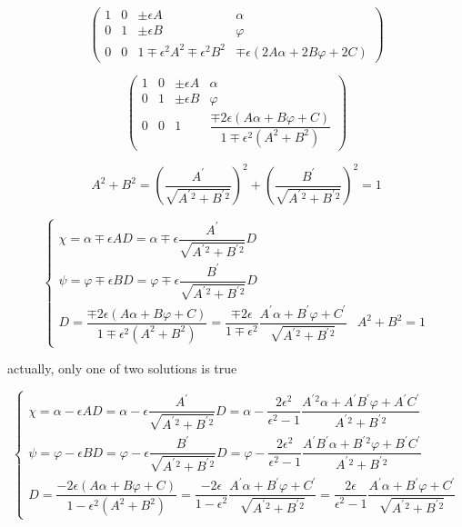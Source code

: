 \documentclass[
]{book}
\theoremstyle{definition}
\theoremstyle{definition}
\theoremstyle{definition}
\theoremstyle{definition}
\theoremstyle{remark}
\begin{document}
\[
\begin{pmatrix}1 & 0 & \pm\epsilon A & \alpha\\
0 & 1 & \pm\epsilon B & \varphi\\
0 & 0 & 1\mp\epsilon^{2}A^{2}\mp\epsilon^{2}B^{2} & \mp\epsilon\left(2A\alpha+2B\varphi+2C\right)
\end{pmatrix}
\]

\[
\begin{pmatrix}1 & 0 & \pm\epsilon A & \alpha\\
0 & 1 & \pm\epsilon B & \varphi\\
0 & 0 & 1 & \dfrac{\mp2\epsilon\left(A\alpha+B\varphi+C\right)}{1\mp\epsilon^{2}\left(A^{2}+B^{2}\right)}
\end{pmatrix}
\]

\[
A^{2}+B^{2}=\left(\dfrac{A^{\prime}}{\sqrt{A^{\prime}{}^{2}+B^{\prime}{}^{2}}}\right)^{2}+\left(\dfrac{B^{\prime}}{\sqrt{A^{\prime}{}^{2}+B^{\prime}{}^{2}}}\right)^{2}=1
\]

\[
\begin{cases}
\chi=\alpha\mp\epsilon AD=\alpha\mp\epsilon\dfrac{A^{\prime}}{\sqrt{A^{\prime}{}^{2}+B^{\prime}{}^{2}}}D\\
\psi=\varphi\mp\epsilon BD=\varphi\mp\epsilon\dfrac{B^{\prime}}{\sqrt{A^{\prime}{}^{2}+B^{\prime}{}^{2}}}D\\
D=\dfrac{\mp2\epsilon\left(A\alpha+B\varphi+C\right)}{1\mp\epsilon^{2}\left(A^{2}+B^{2}\right)}=\dfrac{\mp2\epsilon}{1\mp\epsilon^{2}}\dfrac{A^{\prime}\alpha+B^{\prime}\varphi+C^{\prime}}{\sqrt{A^{\prime}{}^{2}+B^{\prime}{}^{2}}} & A^{2}+B^{2}=1
\end{cases}
\]

actually, only one of two solutions is true

\[
\begin{cases}
\chi=\alpha-\epsilon AD=\alpha-\epsilon\dfrac{A^{\prime}}{\sqrt{A^{\prime}{}^{2}+B^{\prime}{}^{2}}}D=\alpha-\dfrac{2\epsilon^{2}}{\epsilon^{2}-1}\dfrac{A^{\prime}{}^{2}\alpha+A^{\prime}B^{\prime}\varphi+A^{\prime}C^{\prime}}{A^{\prime}{}^{2}+B^{\prime}{}^{2}}\\
\psi=\varphi-\epsilon BD=\varphi-\epsilon\dfrac{B^{\prime}}{\sqrt{A^{\prime}{}^{2}+B^{\prime}{}^{2}}}D=\varphi-\dfrac{2\epsilon^{2}}{\epsilon^{2}-1}\dfrac{A^{\prime}B^{\prime}\alpha+B^{\prime}{}^{2}\varphi+B^{\prime}C^{\prime}}{A^{\prime}{}^{2}+B^{\prime}{}^{2}}\\
D=\dfrac{-2\epsilon\left(A\alpha+B\varphi+C\right)}{1-\epsilon^{2}\left(A^{2}+B^{2}\right)}=\dfrac{-2\epsilon}{1-\epsilon^{2}}\dfrac{A^{\prime}\alpha+B^{\prime}\varphi+C^{\prime}}{\sqrt{A^{\prime}{}^{2}+B^{\prime}{}^{2}}}=\dfrac{2\epsilon}{\epsilon^{2}-1}\dfrac{A^{\prime}\alpha+B^{\prime}\varphi+C^{\prime}}{\sqrt{A^{\prime}{}^{2}+B^{\prime}{}^{2}}}
\end{cases}
\]
\end{document}
